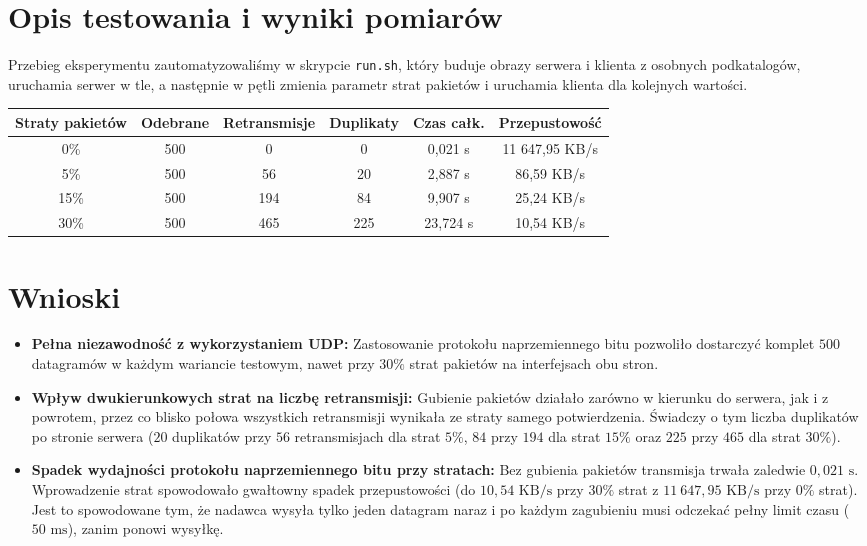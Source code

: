 \documentclass[12pt,a4paper]{article}
\begin{document}
\section*{Opis testowania i wyniki pomiarów}

Przebieg eksperymentu zautomatyzowaliśmy w skrypcie \texttt{run.sh}, który buduje obrazy serwera i klienta z osobnych podkatalogów, uruchamia serwer w tle, a następnie w pętli zmienia parametr strat pakietów i uruchamia klienta dla kolejnych wartości.

\begin{table}[H]
\centering
\footnotesize
\setlength{\tabcolsep}{4.5pt}
\begin{tabular}{|c|c|c|c|c|c|}
\hline
\textbf{Straty pakietów} & \textbf{Odebrane} & \textbf{Retransmisje} & \textbf{Duplikaty} & \textbf{Czas całk.} & \textbf{Przepustowość} \\
\hline
0\% & 500 & 0 & 0 & 0,021 s & 11 647,95 KB/s \\
\hline
5\% & 500 & 56 & 20 & 2,887 s & 86,59 KB/s \\
\hline
15\% & 500 & 194 & 84 & 9,907 s & 25,24 KB/s \\
\hline
30\% & 500 & 465 & 225 & 23,724 s & 10,54 KB/s \\
\hline
\end{tabular}
\end{table}


\section*{Wnioski}

\begin{itemize}
    \item \textbf{Pełna niezawodność z wykorzystaniem UDP:} Zastosowanie protokołu naprzemiennego bitu pozwoliło dostarczyć komplet $500$ datagramów w każdym wariancie testowym, nawet przy $30\%$ strat pakietów na interfejsach obu stron.
    \item \textbf{Wpływ dwukierunkowych strat na liczbę retransmisji:} Gubienie pakietów działało zarówno w kierunku do serwera, jak i z powrotem, przez co blisko połowa wszystkich retransmisji wynikała ze straty samego potwierdzenia. Świadczy o tym liczba duplikatów po stronie serwera ($20$ duplikatów przy $56$ retransmisjach dla strat $5\%$, $84$ przy $194$ dla strat $15\%$ oraz $225$ przy $465$ dla strat $30\%$).
    \item \textbf{Spadek wydajności protokołu naprzemiennego bitu przy stratach:} Bez gubienia pakietów transmisja trwała zaledwie $0{,}021\text{ s}$. Wprowadzenie strat spowodowało gwałtowny spadek przepustowości (do $10{,}54\text{ KB/s}$ przy $30\%$ strat z $11\ 647{,}95\text{ KB/s}$ przy $0\%$ strat). Jest to spowodowane tym, że nadawca wysyła tylko jeden datagram naraz i po każdym zagubieniu musi odczekać pełny limit czasu ($50\text{ ms}$), zanim ponowi wysyłkę.
\end{itemize}
\end{document}
